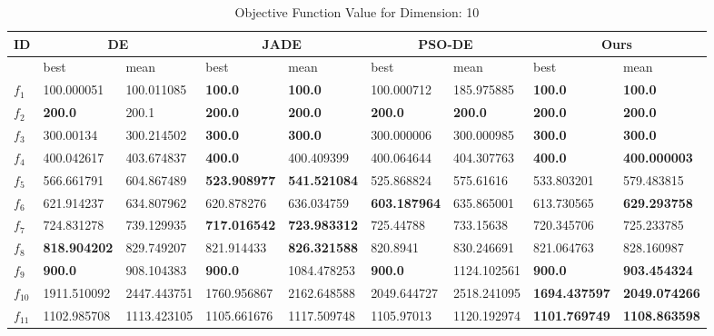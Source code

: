\begingroup
\renewcommand\arraystretch{0.7}
\begin{table*}[t!]
\centering
\caption{Objective Function Value for Dimension: 10}
\vspace{-3mm}
 \begin{tabular}{|p{0.8cm}|p{1.6cm}|p{1.6cm}|p{1.6cm}|p{1.6cm}|p{1.6cm}|p{1.6cm}|p{1.6cm}|p{1.6cm}|} 
 \hline
 ID & \multicolumn{2}{c|}{DE} & \multicolumn{2}{c|}{JADE} & \multicolumn{2}{c|}{PSO-DE} & \multicolumn{2}{c|}{Ours} \\
 \hline
    & best & mean & best & mean & best & mean & best & mean \\ [0.5ex] 
 \hline
$f_1$  & 100.000051 & 100.011085 & \textbf{100.0} & \textbf{100.0} & 100.000712 & 185.975885 & \textbf{100.0} & \textbf{100.0} \\ 
$f_2$  & \textbf{200.0} & 200.1 & \textbf{200.0} & \textbf{200.0} & \textbf{200.0} & \textbf{200.0} & \textbf{200.0} & \textbf{200.0} \\ 
$f_3$  & 300.00134 & 300.214502 & \textbf{300.0} & \textbf{300.0} & 300.000006 & 300.000985 & \textbf{300.0} & \textbf{300.0} \\ 
$f_4$  & 400.042617 & 403.674837 & \textbf{400.0} & 400.409399 & 400.064644 & 404.307763 & \textbf{400.0} & \textbf{400.000003} \\ 
$f_5$  & 566.661791 & 604.867489 & \textbf{523.908977} & \textbf{541.521084} & 525.868824 & 575.61616 & 533.803201 & 579.483815 \\ 
$f_6$  & 621.914237 & 634.807962 & 620.878276 & 636.034759 & \textbf{603.187964} & 635.865001 & 613.730565 & \textbf{629.293758} \\ 
$f_7$  & 724.831278 & 739.129935 & \textbf{717.016542} & \textbf{723.983312} & 725.44788 & 733.15638 & 720.345706 & 725.233785 \\ 
$f_8$  & \textbf{818.904202} & 829.749207 & 821.914433 & \textbf{826.321588} & 820.8941 & 830.246691 & 821.064763 & 828.160987 \\ 
$f_9$  & \textbf{900.0} & 908.104383 & \textbf{900.0} & 1084.478253 & \textbf{900.0} & 1124.102561 & \textbf{900.0} & \textbf{903.454324} \\ 
$f_{10}$  & 1911.510092 & 2447.443751 & 1760.956867 & 2162.648588 & 2049.644727 & 2518.241095 & \textbf{1694.437597} & \textbf{2049.074266} \\ 
$f_{11}$  & 1102.985708 & 1113.423105 & 1105.661676 & 1117.509748 & 1105.97013 & 1120.192974 & \textbf{1101.769749} & \textbf{1108.863598} \\ 

\end{tabular}
\end{table*}
